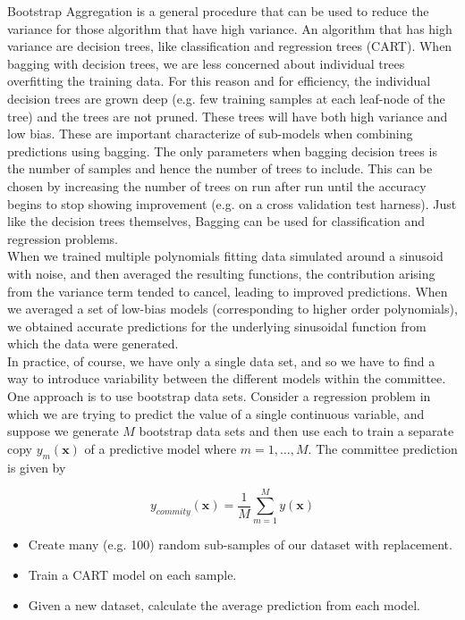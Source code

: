 \documentclass[final, paper=letter,5p,times,twocolumn]{elsarticle}
\begin{document}
Bootstrap Aggregation is a general procedure that can be used to reduce the variance for those algorithm that have high variance. An algorithm that has high variance are decision trees, like classification and regression trees (CART). When bagging with decision trees, we are less concerned about individual trees overfitting the training data. For this reason and for efficiency, the individual decision trees are grown deep (e.g. few training samples at each leaf-node of the tree) and the trees are not pruned. These trees will have both high variance and low bias. These are important characterize of sub-models when combining predictions using bagging. The only parameters when bagging decision trees is the number of samples and hence the number of trees to include. This can be chosen by increasing the number of trees on run after run until the accuracy begins to stop showing improvement (e.g. on a cross validation test harness). Just like the decision trees themselves, Bagging can be used for classification and regression problems. \\

When we trained multiple polynomials fitting data simulated around a sinusoid with noise, and then averaged the resulting functions, the contribution arising from the variance term tended to cancel, leading to improved predictions. When we averaged a set of low-bias models (corresponding to higher order polynomials), we obtained accurate predictions for the underlying sinusoidal function from which the data were generated.\\

In practice, of course, we have only a single data set, and so we have to find a way to introduce variability between the different models within the committee. One approach is to use bootstrap data sets. Consider a regression problem in which we are trying to predict the value of a single continuous variable, and suppose we generate $M$ bootstrap data sets and then use each to train a separate copy $y_{m}(\bm{x})$ of a predictive model where $m = 1, \dots , M$. The committee prediction is given by

$$
y_{commity}(\bm{x}) = \frac{1}{M} \sum_{m = 1}^{M} y(\bm{x})
$$

\begin{itemize}
\item Create many (e.g. 100) random sub-samples of our dataset with replacement.
\item Train a CART model on each sample.
\item Given a new dataset, calculate the average prediction from each model.
\end{itemize}
\end{document}
